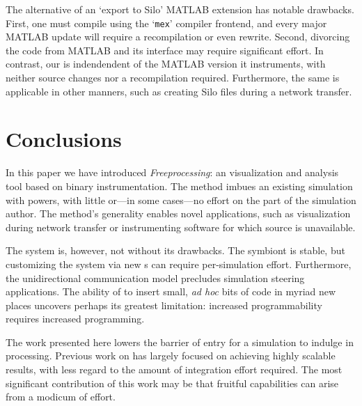 The alternative of an `export to Silo' MATLAB extension has notable
drawbacks. First, one must compile using the `\texttt{mex}' compiler
frontend, and every major MATLAB update will require a recompilation or
even rewrite.  Second, divorcing the code from MATLAB and its interface
may require significant effort.
In contrast, our \freeprocessor{} is indendendent of the MATLAB version
it instruments, with neither source changes nor a recompilation
required.
Furthermore, the same \freeprocessor{} is applicable in other manners,
such as creating Silo files during a network transfer.


\section{Conclusions}
\label{sec:fp-conclusion}

In this paper we have introduced \textit{Freeprocessing}: an \insitu{}
visualization and analysis tool based on binary instrumentation.  The
method imbues
an existing simulation with \insitu{} powers, with little or---in
some cases---no effort on the part of the simulation author.  The
method's generality enables novel applications, such as visualization
during network transfer or instrumenting software for which source is
unavailable.

The system is, however, not without its drawbacks.  The symbiont
is stable, but customizing the system via new
\freeprocessor{}s can require per-simulation effort.  Furthermore,
the unidirectional communication model precludes simulation steering
applications.
The ability of \freeprocessing{} to insert small,
\textit{ad hoc} bits of code in myriad new places uncovers perhaps
its greatest limitation: increased programmability requires increased
programming.

The work presented here lowers the barrier of entry for a
simulation to indulge in \insitu{} processing.  Previous work on
\insitu{} has largely focused on achieving highly scalable results,
with less regard to the amount of integration effort required.  The
most significant contribution of this work may be that fruitful
capabilities can arise from a modicum of effort.

